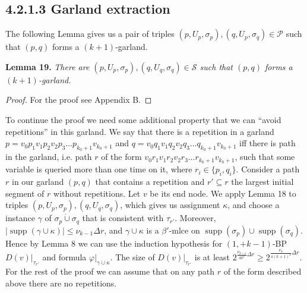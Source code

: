 \documentclass[10pt,a4paper]{article}
\newcommand{\supp}{\operatorname{supp}}
\newcommand{\joint}{\mathbin{\dot\cup}}
\newenvironment{result}[1]{\par\medskip\noindent\textbf{#1.}\itshape}{\par\medskip}
\begin{document}
\subsection*{4.2.1.3 Garland extraction}
The following Lemma gives us a pair of triples $(p,U_p,\sigma_p),(q,U_p,\sigma_q)\in\mathcal P$ such that $(p,q)$ forms a $(k+1)$-garland.
\begin{result}{Lemma 19}
There are $(p,U_p,\sigma_p),(q,U_q,\sigma_q)\in\mathcal S$ such that $(p,q)$ forms a $(k+1)$-garland.
\end{result}
\begin{proof}For the proof see Appendix B.\end{proof}
To continue the proof we need some additional property that we can ``avoid repetitions'' in this garland. We say that there is a repetition in a garland $p=v_0p_1v_1p_2v_2p_3\ldots p_{k_0+1}v_{k_0+1}$ and $q=v_0q_1v_1q_2v_2q_3\ldots q_{k_0+1}v_{k_0+1}$ iff there is path in the garland, i.e. path $r$ of the form $v_0r_1v_1r_2v_2r_3\ldots r_{k_0+1}v_{k_0+1}$, such that some variable is queried more than one time on it, where $r_i\in\{p_i,q_i\}$.
Consider a path $r$ in our garland $(p,q)$ that contains a repetition and $r'\subseteq r$ the largest initial segment of $r$ without repetitions. Let $v$ be its end node. We apply Lemma 18 to triples $(p,U_p,\sigma_p),(q,U_q,\sigma_q)$, which gives us assignment $\kappa$, and choose a instance $\gamma$ of $\sigma_p\joint\sigma_q$ that is consistent with $\tau_{r'}$. Moreover, $|\supp(\gamma\cup\kappa)|\le\nu_{k-1}\Delta r$, and $\gamma\cup\kappa$ is a $\beta'$-mlce on $\supp(\sigma_p)\cup\supp(\sigma_q)$. Hence by Lemma 8 we can use the induction hypothesis for $(1,+k-1)$-BP $D(v)|_{\tau_{r'}}$ and formula $\varphi|_{\gamma\cup\kappa}$. The size of $D(v)|_{\tau_{r'}}$ is at least $2^{\frac{\nu_{k-1}}{4k^2}\Delta r}\ge2^{\frac{\nu_k}{4(k+1)^2}\Delta r}$.
For the rest of the proof we can assume that on any path $r$ of the form described above there are no repetitions.
\end{document}
